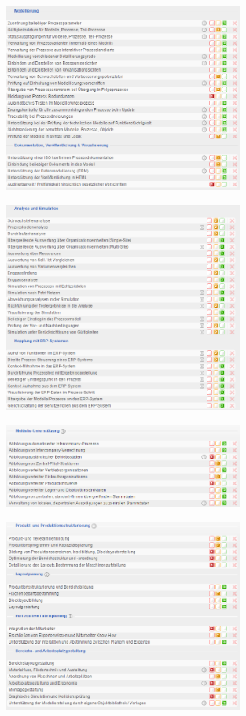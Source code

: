 \documentclass[12pt]{article}
\begin{document}
\begin{figure}[here!]
\centering
\includegraphics[width=0.7\textwidth]{images/tr41}
\end{figure}\FloatBarrier
\noindent
\begin{figure}[here!]
\centering
\includegraphics[width=0.7\textwidth]{images/tr42}
\end{figure}\FloatBarrier
\noindent
\begin{figure}[here!]
\centering
\includegraphics[width=0.7\textwidth]{images/tr43}
\end{figure}\FloatBarrier
\noindent
\begin{figure}[here!]
\centering
\includegraphics[width=0.7\textwidth]{images/tr44}
\end{figure}\FloatBarrier
\end{document}
